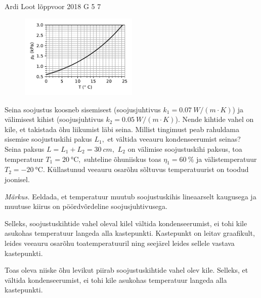 {Ardi Loot} %
{lõppvoor} %
{2018} %
{G 5} %
{7} %
{
\ifStatement
\begin{figure}
\vspace{-30pt}
\begin{center}
\includegraphics[width=0.5\textwidth]{2018-v3g-05-kullastunud-aur}
\par\end{center} 
\end{figure}

Seina soojustus koosneb sisemisest (soojusjuhtivus $k_{1}=\SI{0.07}{W/\left(m\cdot K\right)}$)
ja välimisest kihist (soojusjuhtivus $k_{2}=\SI{0.05}{W/\left(m\cdot K\right)}$).
Nende kihtide vahel on kile, et takistada õhu liikumist läbi seina.
Millist tingimust peab rahuldama sisemise soojustuskihi pakus $L_{1},$
et vältida veeauru kondenseerumist seinas? Seina paksus $L=L_{1}+L_{2}=\SI{30}{cm},$
$L_{2}$ on välimise soojustuskihi paksus, toa temperatuur $T_{1}=\SI{20}{\celsius},$
suhteline õhuniiskus toas $\eta_{1}=\SI{60}{\percent}$ ja välistemperatuur
$T_{2}=\SI{-20}{\celsius}.$ Küllastunud veeauru osarõhu sõltuvus
temperatuurist on toodud joonisel.

\emph{Märkus.} Eeldada, et temperatuur muutub soojustuskihis lineaarselt
kaugusega ja muutuse kiirus on pöördvõrdeline soojusjuhtivusega. 
\fi


\ifHint
Selleks, soojustuskihtide vahel oleval kilel vältida kondenseerumist, ei tohi kile asukohas temperatuur
langeda alla kastepunkti. Kastepunkt on leitav graafikult, leides veeauru osarõhu toatemperatuuril ning seejärel leides sellele vastava kastepunkti.
\fi


\ifSolution
Toas oleva niiske õhu levikut piirab soojustuskihtide vahel olev kile.
Selleks, et vältida kondenseerumist, ei tohi kile asukohas temperatuur
langeda alla kastepunkti. 

}
